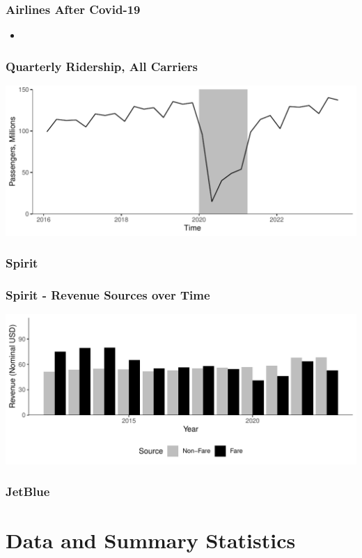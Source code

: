 \documentclass[xcolor=dvipsnames]{beamer}
\begin{document}
    \begin{frame}
        \frametitle{Airlines After Covid-19}
        \begin{itemize}
            \item 
        \end{itemize}
    \end{frame}

    \begin{frame}
        \frametitle{Quarterly Ridership, All Carriers}
        \includegraphics[width = \linewidth]{Quarterly_DB1B_Itineraries}
    \end{frame}

    \begin{frame}
        \frametitle{Spirit}
        
    \end{frame}

    \begin{frame}
     \frametitle{Spirit - Revenue Sources over Time}
        \includegraphics[width = \linewidth]{05.Figures/Spirit_Revenue_Sources.pdf}
    \end{frame}

    \begin{frame}
        \frametitle{JetBlue}
        
    \end{frame}

    \section{Data and Summary Statistics}
\end{document}
